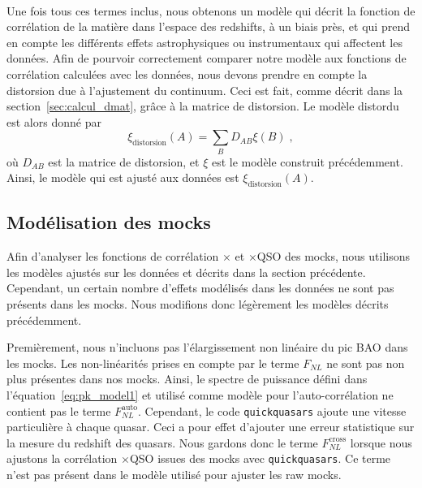 \paragraph{}
Une fois tous ces termes inclus, nous obtenons un modèle qui décrit la fonction de corrélation de la matière dans l'espace des redshifts, à un biais près, et qui prend en compte les différents effets astrophysiques ou instrumentaux qui affectent les données.
Afin de pourvoir correctement comparer notre modèle aux fonctions de corrélation calculées avec les données, nous devons prendre en compte la distorsion due à l'ajustement du continuum. Ceci est fait, comme décrit dans la section~\ref{sec:calcul_dmat}, grâce à la matrice de distorsion. Le modèle distordu est alors donné par
\begin{equation}
  \label{eq:model_dist}
  \xi_{\mathrm{distorsion}}(A) = \sum_{B}D_{AB}\xi(B) \; ,
\end{equation}
où $D_{AB}$ est la matrice de distorsion, et $\xi$ est le modèle construit précédemment.
Ainsi, le modèle qui est ajusté aux données est $\xi_{\mathrm{distorsion}}(A)$.



\subsection{Modélisation des mocks}
\label{subsec:model_mock}
Afin d'analyser les fonctions de corrélation \lya{}$\times$\lya{} et \lya{}$\times$QSO des mocks, nous utilisons les modèles ajustés sur les données et décrits dans la section précédente. Cependant, un certain nombre d'effets modélisés dans les données ne sont pas présents dans les mocks. Nous modifions donc légèrement les modèles décrits précédemment.

Premièrement, nous n'incluons pas l'élargissement non linéaire du pic BAO dans les mocks. %
Les non-linéarités prises en compte par le terme $F_{NL}$ ne sont pas non plus présentes dans nos mocks. Ainsi, le spectre de puissance défini dans l'équation~\ref{eq:pk_model1} et utilisé comme modèle pour l'auto-corrélation ne contient pas le terme $F_{NL}^{\mathrm{auto}}$. Cependant, le code \texttt{quickquasars} ajoute une vitesse particulière à chaque quasar. Ceci a pour effet d'ajouter une erreur statistique sur la mesure du redshift des quasars. Nous gardons donc le terme $F_{NL}^{\mathrm{cross}}$ lorsque nous ajustons la corrélation \lya{}$\times$QSO issues des mocks avec \texttt{quickquasars}. Ce terme n'est pas présent dans le modèle utilisé pour ajuster les raw mocks.

